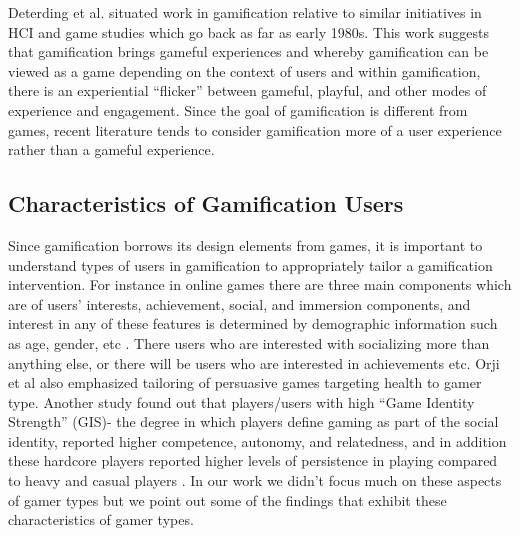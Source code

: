 \documentclass{sig-alternate}
\begin{document}
Deterding et al. \cite{deterding2011game} situated work in gamification relative to similar initiatives in HCI and game studies which go back as far as early 1980s. This work suggests that gamification brings gameful experiences and whereby gamification can be viewed as a game depending on the context of users and within gamification, there is an experiential ``flicker'' between gameful, playful, and other modes of experience and engagement. Since the goal of gamification is different from games, recent literature  tends to consider gamification more of a user experience rather than a gameful experience\cite{seaborn2015:gamification}.
\subsection{Characteristics of Gamification Users}
Since gamification borrows its design elements from games, it is important to understand types of users in gamification to appropriately tailor a gamification intervention. For instance in online games there are three main components which are of users' interests, achievement, social, and immersion components, and interest in any of these features is determined by demographic information such as age, gender, etc \cite{yee2006:motivations}. There users who are interested with socializing more than anything else, or there will be users who are interested in achievements etc. Orji et al also \cite{orji2013:tailoring} emphasized tailoring of persuasive games targeting health to gamer type. Another study found out that players/users with high ``Game Identity Strength'' (GIS)- the degree in which players define gaming as part of the social identity, reported higher competence, autonomy, and relatedness, and in addition these hardcore players reported higher levels of persistence in playing compared to heavy and casual players \cite{neys2014:exploring}. In our work we didn't focus much on these aspects of gamer types but we point out some of the findings that exhibit these characteristics of gamer types. 
\end{document}
